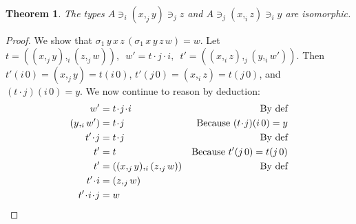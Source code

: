 \documentclass[english]{PaperTools/latex/entcs}
\theoremstyle{plain}
\newtheorem{theorem}{Theorem}
\theoremstyle{definition}
\theoremstyle{remark}
\newcommand\CP[3]{(#2,_{#1} #3)}
\newcommand\param[1]{\!\cdot\!#1}
\newcommand\op[1]{∋_{#1}}
\newcommand\mor[2]{({#1}\,{#2})}
\newcommand\proj[2]{{#2}\mor{#1}0}
\newcommand\projp[2]{\proj{#1}{(#2)}}
\def\ie{\textit{i.e.}}
\begin{document}
\begin{theorem}
  The types $A \op i \CP j x y \op j z$ and $A \op j \CP i x z \op i y$ are isomorphic.
\end{theorem}
\begin{proof}
  We show that %
  $\sigma_1\, y\, x\, z\, (\sigma_1\, x\, y\, z\, w) = w$.
  Let
    $t = \CP i {\CP j x y}{\CP j z w},\enspace
    w' = t \param j \param i,\enspace
    t' = \CP j {\CP i x z}{\CP i y {w'}}.$
  Then
  $\proj i {t'} = \CP j x y = \proj i t$,
  $\proj j {t'} = \CP i x z = \proj j t$, and
  $\projp i {t\param j} = y$.
We now continue to reason by deduction:
  \begin{align*}
    w' &= t \param j \param i & \text{By def}\\
    {\CP i y {w'}} &= t\param j & \text{Because $\projp i {t\param j} = y $}  \\
    t'\param j &= t\param j & \text{By def}\\
    t' &= t &\text{Because $\proj j {t'} = \proj j t$} \\
    t' &= \CP i {\CP j x y} {\CP j z w} & \text{By def} \\
    t'\param i &= \CP j z w \\
    t'\param i\param j &= w
  \qedhere
  \end{align*}
\end{proof}
\end{document}
